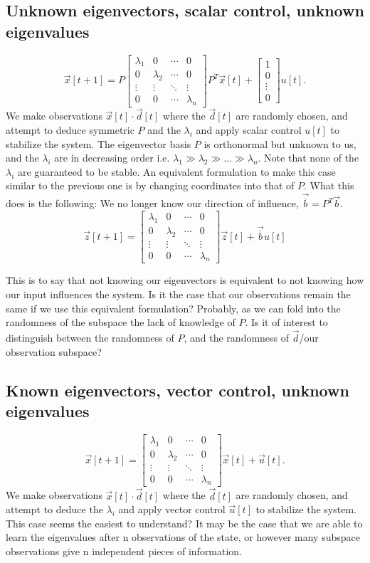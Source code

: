 \documentclass[letterpaper]{article}
\theoremstyle{remark}
\newcommand{\mat}[1]{\ensuremath{\begin{bmatrix}#1\end{bmatrix}}}
\begin{document}
\subsection*{Unknown eigenvectors, scalar control, unknown eigenvalues}
\[
    \vec{x}[t + 1] = P\mat{\lambda_1 & 0 & \cdots & 0 \\ 0 & \lambda_2 & \cdots & 0 \\ \vdots  & \vdots & \ddots & \vdots \\ 0 & 0 & \cdots & \lambda_n}P^T \vec{x}[t] + \mat{1 \\ 0 \\ \vdots \\ 0}u[t].
\]
We make observations $\vec{x}[t] \cdot \vec{d}[t]$ where the $\vec{d}[t]$ are randomly chosen, and attempt to deduce symmetric $P$ and the $\lambda_i$ and apply scalar control $u[t]$ to stabilize the system. The eigenvector basis $P$ is orthonormal but unknown to us, and the $\lambda_i$ are in decreasing order i.e. $\lambda_1 \gg \lambda_2 \gg \ldots \gg \lambda_n$. Note that none of the $\lambda_i$ are guaranteed to be stable. An equivalent formulation to make this case similar to the previous one is by changing coordinates into that of $P$. What this does is the following: We no longer know our direction of influence, $\vec{\overline{b}} = P^T\vec{b}$.
\[
    \vec{z}[t+1] = \mat{\lambda_1 & 0 & \cdots & 0 \\ 0 & \lambda_2 & \cdots & 0 \\ \vdots  & \vdots & \ddots & \vdots \\ 0 & 0 & \cdots & \lambda_n}\vec{z}[t] + \vec{\overline{b}}u[t]
\]

This is to say that not knowing our eigenvectors is equivalent to not knowing how our input influences the system. Is it the case that our observations remain the same if we use this equivalent formulation? Probably, as we can fold into the randomness of the subspace the lack of knowledge of $P$. Is it of interest to distinguish between the randomness of $P$, and the randomness of $\vec{d}$/our observation subspace?

\subsection*{Known eigenvectors, vector control, unknown eigenvalues}
\[
    \vec{x}[t + 1] = \mat{\lambda_1 & 0 & \cdots & 0 \\ 0 & \lambda_2 & \cdots & 0 \\ \vdots  & \vdots & \ddots & \vdots \\ 0 & 0 & \cdots & \lambda_n} \vec{x}[t] + \vec{u}[t].
\]
We make observations $\vec{x}[t] \cdot \vec{d}[t]$ where the $\vec{d}[t]$ are randomly chosen, and attempt to deduce the $\lambda_i$ and apply vector control $\vec{u}[t]$ to stabilize the system. This case seems the easiest to understand? It may be the case that we are able to learn the eigenvalues after n observations of the state, or however many subspace observations give n independent pieces of information.
\end{document}

